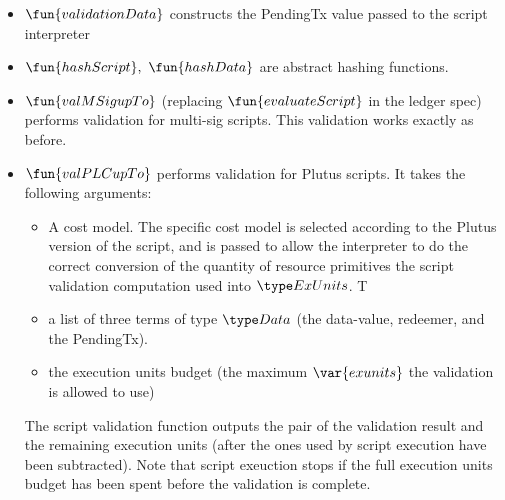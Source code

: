 \begin{itemize}
  \item $\fun{validationData}$ constructs the PendingTx value passed
  to the script interpreter
  \item $\fun{hashScript},~ \fun{hashData}$ are abstract hashing functions.
  \item $\fun{valMSigupTo}$ (replacing $\fun{evaluateScript}$ in the ledger spec) performs
  validation for multi-sig scripts.
  This validation works exactly as before.
  \item $\fun{valPLCupTo}$ performs validation for Plutus scripts. It takes the following
  arguments:
  \begin{itemize}
  \item A cost model. The specific cost model is selected according to the Plutus
  version of the script, and is passed to allow the interpreter to do the
  correct conversion of the quantity of resource primitives the script validation
  computation used into $\ExUnits$. T
  \item
  a list of three terms of type $\Data$ (the data-value, redeemer,
  and the PendingTx).
  \item the execution units budget (the maximum $\var{exunits}$
  the validation is allowed to use)
  \end{itemize}
  The script validation function outputs the pair of the validation result
  and the remaining execution units (after the ones used by script execution
  have been subtracted). Note that script exeuction stops if the full execution
  units budget has been spent before the validation is complete.
\end{itemize}


